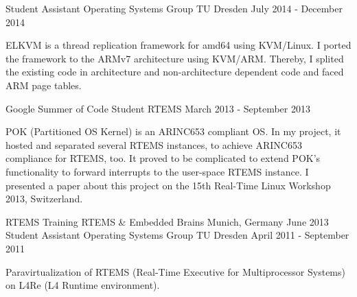 \begin{cventries}
  \cventry
    {Student Assistant}
    {Operating Systems Group}
    {TU Dresden}
    {July 2014 - December 2014}
    {
      \begin{cvitems}
      \item[] {ELKVM is a thread replication framework for amd64 using KVM/Linux.
      I ported the framework to the ARMv7 architecture using
      KVM/ARM. Thereby, I splited the existing code in architecture and
    non-architecture dependent code and faced ARM page tables. }
      \end{cvitems}
    }
  \cventry
    {Google Summer of Code Student}
    {RTEMS}
    {}
    {March 2013 - September 2013}
    {
      \begin{cvitems}
      \item[] {POK (Partitioned OS Kernel) is an ARINC653 compliant OS. In my
	  project, it hosted and separated several RTEMS instances, to achieve
      ARINC653 compliance for RTEMS, too. It proved to be complicated to extend
      POK's functionality to forward interrupts to the user-space RTEMS
      instance. I presented a paper about this project on the 15th Real-Time Linux
    Workshop 2013, Switzerland.}
      \end{cvitems}
    }
  \cventry
    {RTEMS Training}
    {RTEMS \& Embedded Brains}
    {Munich, Germany}
    {June 2013}
    {
    }
  \cventry
    {Student Assistant}
    {Operating Systems Group}
    {TU Dresden}
    {April 2011 - September 2011}
    {
      \begin{cvitems}
      \item[] {Paravirtualization of RTEMS (Real-Time Executive for
	Multiprocessor Systems) on L4Re (L4 Runtime environment).}
      \end{cvitems}
    }
\end{cventries}
